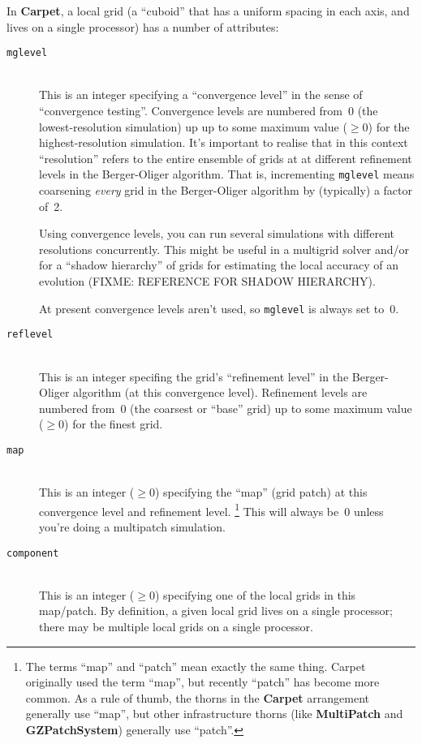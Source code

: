 \documentclass{article}
\def\arrangement#1{\textbf{#1}}
\def\thorn#1{\textbf{#1}}
\begin{document}
In \thorn{Carpet}, a local grid (a ``cuboid'' that has a uniform spacing
in each axis, and lives on a single processor) has a number of attributes:
\begin{description}
\item[\texttt{mglevel}]%
\mbox{}\\
	This is an integer specifying a ``convergence level''
	in the sense of ``convergence testing''.  Convergence levels
	are numbered from~0 (the lowest-resolution simulation)
	up up to some maximum value ($\ge 0$) for the highest-resolution
	simulation.  It's important to realise that in this context
	``resolution'' refers to the entire ensemble of grids at
	at different refinement levels in the Berger-Oliger algorithm.
	That is, incrementing \texttt{mglevel} means coarsening
	\emph{every} grid in the Berger-Oliger algorithm by
	(typically) a factor of~2.

	Using convergence levels, you can run several simulations
	with different resolutions concurrently.  This might be useful
	in a multigrid solver and/or for a ``shadow hierarchy'' of
	grids for estimating the local accuracy of an evolution
	(FIXME: REFERENCE FOR SHADOW HIERARCHY).

	At present convergence levels aren't used, so \texttt{mglevel}
	is always set to~0.
\item[\texttt{reflevel}]%
\mbox{}\\
	This is an integer specifing the grid's ``refinement level''
	in the Berger-Oliger algorithm (at this convergence level).
	Refinement levels are numbered from~0 (the coarsest or ``base''
	grid) up to some maximum value ($\ge 0$) for the finest grid.
\item[\texttt{map}]
\mbox{}\\
	This is an integer ($\ge 0$) specifying the ``map'' (grid patch)
	at this convergence level and refinement level.%
\footnote{%
	 The terms ``map'' and ``patch'' mean exactly the same
	 thing.  Carpet originally used the term ``map'', but
	 recently ``patch'' has become more common.  As a rule of
	 thumb, the thorns in the \arrangement{Carpet} arrangement
	 generally use ``map'', but other infrastructure thorns
	 (like \thorn{MultiPatch} and \thorn{GZPatchSystem})
	 generally use ``patch''.
	 }%
{}	This will always be~0 unless you're doing a multipatch simulation.
\item[\texttt{component}]
\mbox{}\\
	This is an integer ($\ge 0$) specifying one of the local
	grids in this map/patch.  By definition, a given local grid
	lives on a single processor; there may be multiple local grids
	on a single processor.
\end{description}
\end{document}
